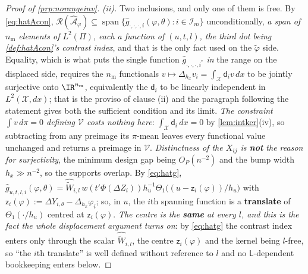 \begin{proof}[Proof of \cref{prp:norangeinv}]
\emph{(ii).} Two inclusions, and only one of them is free. By \eqref{eq:hatAcon},
$\mathcal R(\hat{\mathcal A}_\varphi)\subseteq\operatorname{span}\{\hat g_{\cdot,\cdot,\cdot,i}(\varphi,\theta):i\in\mathcal I_m\}$
unconditionally, \emph{a span of $n_{\mathrm m}$ elements of $L^{2}(\Pi)$, each a function of
$(u,t,l)$, the third dot being \cref{def:hatAcon}'s contrast index}, and that is the only fact used
on the $\tilde\varphi$ side. Equality, which is what
puts the single function $\hat g_{\cdot,\cdot,\cdot,i^\ast}$ \emph{in} the range on the displaced side, 
requires the $n_{\mathrm m}$ functionals $v\mapsto\Delta_{h_x}v_i=\int_{\mathcal X}\mathsf d_iv\,dx$ to
be jointly surjective onto $\IR^{n_{\mathrm m}}$, equivalently the $\mathsf d_i$ to be linearly
independent in $L^{2}(\mathcal X,dx)$; that is the proviso of clause (ii) and the paragraph following
the statement gives both the sufficient condition and its limit. \emph{The constraint
$\int v\,d\pi=0$ defining $\mathcal V$ costs nothing here}: $\int_{\mathcal X}\mathsf d_i\,dx=0$ by
\cref{lem:intker}(iv), so subtracting from any preimage its $\pi$-mean leaves every functional value
unchanged and returns a preimage in $\mathcal V$. \emph{Distinctness of the $X_{ij}$ is \textbf{not} the
reason for surjectivity}, the minimum design gap being $O_P(n^{-2})$
and the bump width $h_x\gg n^{-2}$, so the supports overlap. By
\eqref{eq:hatg},
$\hat g_{u,t,l,i}(\varphi,\theta)=\widehat{\widetilde W}_{i,l}\,w(t'\Phi(\Delta Z_i))h_u^{-1}\Theta_1\big((u-\mathsf z_i(\varphi))/h_u\big)$
with $\mathsf z_i(\varphi):=\Delta Y_{i,\theta}-\Delta_{h_x}\varphi_i$; so, in $u$, the $i$th spanning
function is a \textbf{translate} of $\Theta_1(\cdot/h_u)$ centred at $\mathsf z_i(\varphi)$.
\emph{The centre is the \textbf{same} at every $l$, and this is the fact the whole displacement
argument turns on}: by \eqref{eq:hatg} the
contrast index enters only through the scalar $\widehat{\widetilde W}_{i,l}$, the centre
$\mathsf z_i(\varphi)$ and the kernel being $l$-free, so ``the $i$th translate'' is well defined
without reference to $l$ and no $\mathsf L$-dependent bookkeeping enters below.


\end{proof}
